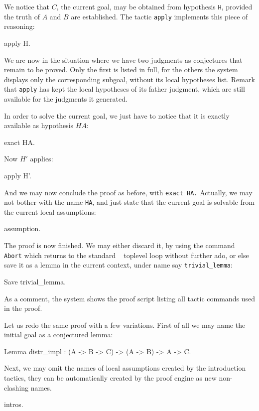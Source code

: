 \documentclass[11pt,a4paper]{book}
\begin{document}
We notice that $C$, the current goal, may be obtained from hypothesis
\verb:H:, provided the truth of $A$ and $B$ are established.
The tactic \verb:apply: implements this piece of reasoning:
\begin{coq_example}
apply H.
\end{coq_example}

We are now in the situation where we have two judgments as conjectures
that remain to be proved. Only the first is listed in full, for the
others the system displays only the corresponding subgoal, without its
local hypotheses list. Remark that \verb:apply: has kept the local
hypotheses of its father judgment, which are still available for
the judgments it generated.

In order to solve the current goal, we just have to notice that it is
exactly available as hypothesis $HA$:
\begin{coq_example}
exact HA.
\end{coq_example}

Now $H'$ applies:
\begin{coq_example}
apply H'.
\end{coq_example}

And we may now conclude the proof as before, with \verb:exact HA.:
Actually, we may not bother with the name \verb:HA:, and just state that
the current goal is solvable from the current local assumptions:
\begin{coq_example}
assumption.
\end{coq_example}

The proof is now finished. We may either discard it, by using the
command \verb:Abort: which returns to the standard \Coq~ toplevel loop
without further ado, or else save it as a lemma in the current context,
under name say \verb:trivial_lemma::
\begin{coq_example}
Save trivial_lemma.
\end{coq_example}

As a comment, the system shows the proof script listing all tactic
commands used in the proof. 

Let us redo the same proof with a few variations. First of all we may name
the initial goal as a conjectured lemma:
\begin{coq_example}
Lemma distr_impl : (A -> B -> C) -> (A -> B) -> A -> C.
\end{coq_example}

Next, we may omit the names of local assumptions created by the introduction
tactics, they can be automatically created by the proof engine as new
non-clashing names.
\begin{coq_example}
intros.
\end{coq_example}
\end{document}
